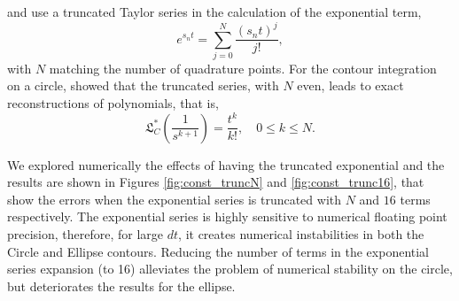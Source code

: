 \documentclass[10pt,a4paper,final]{article}
\begin{document}
\citet{cclancy11} and \citet{clancy:PhD} use a truncated Taylor series in the calculation of the exponential term,
\begin{equation}
{e }^{ { s }_{ n }t }=\sum_{j=0}^{N}\frac{(s_nt)^j}{j!},
\end{equation}
with $N$ matching the number of quadrature points. For the contour integration  on a circle, \citet{clancy:PhD} showed that the truncated series, with $N$ even, leads to exact reconstructions of polynomials, that is, 
\begin{equation}
\mathfrak{ L }^{ * }_C\left(\frac{1}{s^{k+1}}\right)=\frac{t^k}{k!}, \quad 0\leq k \leq N.
\end{equation}

We explored numerically the effects of having the truncated exponential and the results are shown in  Figures \ref{fig:const_truncN} and \ref{fig:const_trunc16}, that show the errors when the exponential series is truncated with $N$ and $16$ terms respectively. The exponential series is highly sensitive to numerical floating point precision, therefore, for large $dt$, it creates numerical instabilities in both the Circle and Ellipse contours. Reducing the number of terms in the exponential series expansion (to 16) alleviates the problem of numerical stability on the circle, but deteriorates the results for the ellipse.
\end{document}
